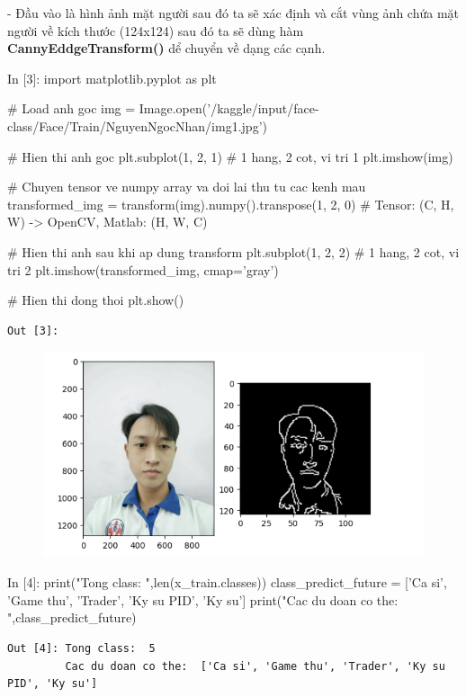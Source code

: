 \documentclass[12pt, a4paper]{article}
\begin{document}
- Đầu vào là hình ảnh mặt người sau đó ta sẽ xác định và cắt vùng ảnh chứa mặt người về kích thước (124x124) sau đó ta sẽ dùng hàm \textbf{CannyEddgeTransform()} dể chuyển về dạng các cạnh.


\begin{python}
In [3]: import matplotlib.pyplot as plt
        
        # Load anh goc
        img = Image.open('/kaggle/input/face-class/Face/Train/NguyenNgocNhan/img1.jpg')
        
        # Hien thi anh goc
        plt.subplot(1, 2, 1) # 1 hang, 2 cot, vi tri 1
        plt.imshow(img)
        
        # Chuyen tensor ve numpy array va doi lai thu tu cac kenh mau
        transformed_img = transform(img).numpy().transpose(1, 2, 0) 
        # Tensor: (C, H, W) -> OpenCV, Matlab: (H, W, C)
        
        # Hien thi anh sau khi ap dung transform
        plt.subplot(1, 2, 2) # 1 hang, 2 cot, vi tri 2
        plt.imshow(transformed_img, cmap='gray')
        
        # Hien thi dong thoi
        plt.show()
\end{python}
\newpage
\begin{verbatim}
Out [3]: 
\end{verbatim}
\begin{figure}[h] %
    \centering
    \includegraphics[scale = 0.8]{Img/Pre_Fut/P1.png}
\end{figure}

\begin{python}
In [4]: print("Tong class: ",len(x_train.classes))
        class_predict_future = ['Ca si', 'Game thu', 'Trader', 'Ky su PID', 'Ky su']
        print("Cac du doan co the: ",class_predict_future)
\end{python}
\begin{verbatim}
Out [4]: Tong class:  5
         Cac du doan co the:  ['Ca si', 'Game thu', 'Trader', 'Ky su PID', 'Ky su'] 

\end{verbatim}
\end{document}
